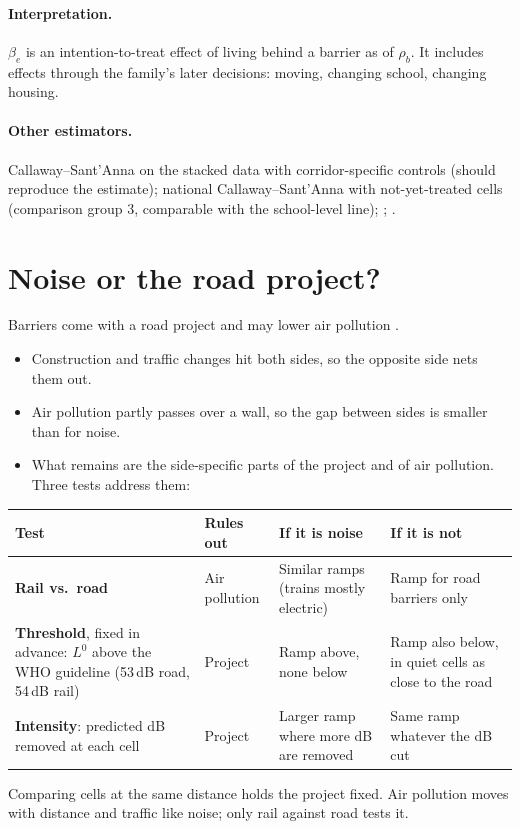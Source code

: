 \documentclass[11pt]{article}
\begin{document}
\paragraph{Interpretation.} \(\beta_e\) is an intention-to-treat effect of living behind a
barrier as of \(\rho_b\). It includes effects through the family's later decisions: moving,
changing school, changing housing.

\paragraph{Other estimators.} Callaway--Sant'Anna on the stacked data with corridor-specific
controls (should reproduce the estimate); national Callaway--Sant'Anna with not-yet-treated
cells (comparison group 3, comparable with the school-level line);
\textcite{sunEstimatingDynamicTreatment2021}; \textcite{borusyakRevisitingEventStudyDesigns2024}.

\section{Noise or the road project?}\label{sec:noise}

Barriers come with a road project and may lower air pollution
\autocite{baldaufImpactsNoiseBarriers2008,greenhillNoisePollutionInfant2026}.
\begin{itemize}
\item Construction and traffic changes hit both sides, so the opposite side nets them out.
\item Air pollution partly passes over a wall, so the gap between sides is smaller than for
  noise.
\item What remains are the side-specific parts of the project and of air pollution. Three tests
  address them:
\end{itemize}

\begin{center}
\footnotesize
\renewcommand{\arraystretch}{1.2}
\begin{tabular}{@{}L{0.3\textwidth}L{0.13\textwidth}L{0.24\textwidth}L{0.24\textwidth}@{}}
\toprule
\textbf{Test} & \textbf{Rules out} & \textbf{If it is noise} & \textbf{If it is not} \\
\midrule
\textbf{Rail vs.\ road} & Air pollution & Similar ramps (trains mostly electric) & Ramp for road barriers only \\
\textbf{Threshold}, fixed in advance: \(L^0\) above the WHO guideline (53\,dB road, 54\,dB rail) & Project & Ramp above, none below & Ramp also below, in quiet cells as close to the road \\
\textbf{Intensity}: predicted dB removed at each cell & Project & Larger ramp where more dB are removed & Same ramp whatever the dB cut \\
\bottomrule
\end{tabular}
\end{center}
Comparing cells at the same distance holds the project fixed. Air pollution moves with distance
and traffic like noise; only rail against road tests it.
\end{document}
